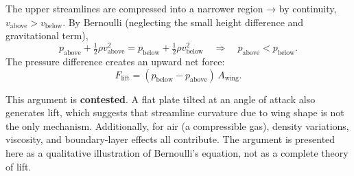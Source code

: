 \documentclass[../main.tex]{subfiles}
\begin{document}
\begin{center}
\end{center}

The upper streamlines are compressed into a narrower region → by continuity, $v_{\mathrm{above}}>v_{\mathrm{below}}$. By Bernoulli (neglecting the small height difference and gravitational term),
\begin{equation}
  p_{\mathrm{above}} + \tfrac{1}{2}\rho v_{\mathrm{above}}^2
  =
  p_{\mathrm{below}} + \tfrac{1}{2}\rho v_{\mathrm{below}}^2
  \quad\Longrightarrow\quad p_{\mathrm{above}} < p_{\mathrm{below}}.
\end{equation}
The pressure difference creates an upward net force:
\begin{equation}
  \boxed{F_{\mathrm{lift}} = (p_{\mathrm{below}}-p_{\mathrm{above}})\,A_{\mathrm{wing}}.}
  \label{eq:lec13_lift}
\end{equation}

\begin{remark}
This argument is \textbf{contested}. A flat plate tilted at an angle of attack also generates lift, which suggests that streamline curvature due to wing shape is not the only mechanism. Additionally, for air (a compressible gas), density variations, viscosity, and boundary-layer effects all contribute. The argument is presented here as a qualitative illustration of Bernoulli's equation, not as a complete theory of lift.
\end{remark}
\end{document}
